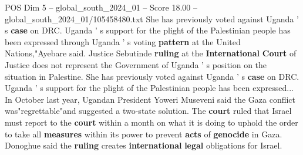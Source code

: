 \begin{textsample}{POS Dim 5 – global\_south\_2024\_01 – Score 18.00 – global\_south\_2024\_01/105458480.txt}
She has previously voted against Uganda ' s \textbf{case} on DRC.
Uganda ' s support for the plight of the Palestinian people has been expressed through Uganda ' s voting \textbf{pattern} at the United Nations,"Ayebare said.
Justice Sebutinde \textbf{ruling} at the \textbf{International} \textbf{Court} of Justice does not represent the Government of Uganda ' s position on the situation in Palestine.
She has previously voted against Uganda ' s \textbf{case} on DRC.
Uganda ' s support for the plight of the Palestinian people has been expressed...
In October last year, Ugandan President Yoweri Museveni said the Gaza conflict was"regrettable"and suggested a two-state solution.
The \textbf{court} ruled that Israel must report to the \textbf{court} within a month on what it is doing to uphold the order to take all \textbf{measures} within its power to prevent \textbf{acts} of \textbf{genocide} in Gaza.
Donoghue said the \textbf{ruling} creates \textbf{international} \textbf{legal} obligations for Israel.

\end{textsample}
